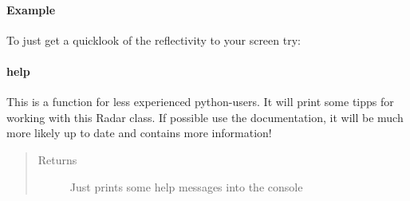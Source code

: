 \documentclass[letterpaper,10pt,english]{sphinxmanual}
\begin{document}
\begin{fulllineitems}
\begin{fulllineitems}
\paragraph{Example}

To just get a quicklook of the reflectivity to your screen try:

\begin{sphinxVerbatim}[commandchars=\\\{\}]
   
\end{sphinxVerbatim}

\end{fulllineitems}



\paragraph{help}
\label{\detokenize{generated/MPPy.Instruments.Radar.Radar.help:help}}\label{\detokenize{generated/MPPy.Instruments.Radar.Radar.help::doc}}

\begin{fulllineitems}
\label{\detokenize{generated/MPPy.Instruments.Radar.Radar.help:MPPy.Instruments.Radar.Radar.help}}
This is a function for less experienced python-users. It will print some tipps for working with this Radar
class. If possible use the documentation, it will be much more likely up to date and contains more information!
\begin{quote}\begin{description}
\item[{Returns}] \leavevmode
Just prints some help messages into the console

\end{description}\end{quote}

\end{fulllineitems}


\end{fulllineitems}
\end{document}
